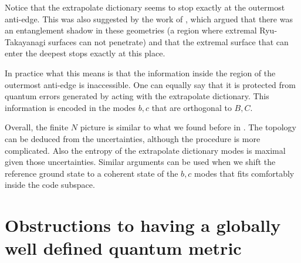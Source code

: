 \documentclass[12pt,nofootinbib, longbibliography]{revtex4-1}
\begin{document}
Notice that the extrapolate dictionary seems to stop exactly at the outermost anti-edge. This was also suggested by the work of \cite{Balasubramanian:2017hgy}, which argued that there was an entanglement shadow in these geometries (a region where extremal Ryu-Takayanagi surfaces \cite{Ryu:2006bv} can not penetrate) and that the extremal surface that can enter the deepest stops exactly at this place.

In practice what this means is that the information inside the region of the outermost anti-edge is inaccessible. One can equally say that it is protected from quantum errors  generated by acting with the extrapolate dictionary. This information is encoded in  the modes $b,c$ that are orthogonal to $B,C$. 

Overall, the finite $N$ picture is similar to what we found before in \cite{Berenstein:2017abm, Berenstein:2016pcx}. The topology can be deduced from the uncertainties, although the procedure is more complicated. Also the entropy of the extrapolate dictionary modes is maximal given those uncertainties. Similar arguments can be used when we shift the reference ground state to a coherent state of the $b,c$ modes that fits comfortably inside the code subspace.


\section{Obstructions to having a globally well defined quantum metric}\label{sec:obs}
\end{document}
